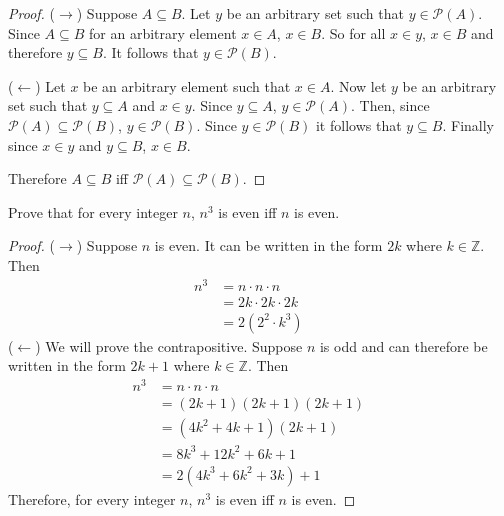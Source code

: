 \begin{proof}
    ($\rightarrow$) Suppose $A \subseteq B$. 
    Let $y$ be an arbitrary set such that $y \in \mathcal{P}(A)$. 
    Since $A \subseteq B$ for an arbitrary element  $x \in A$, $x \in B$. 
    So for all $x \in y$, $x \in B$ and therefore $y \subseteq B$.
    It follows that $y \in \mathcal{P}(B)$.

    ($\leftarrow$) 
    Let $x$ be an arbitrary element such that $x \in A$.
    Now let $y$ be an arbitrary set such that $y \subseteq A$ and $x \in y$.
    Since $y \subseteq A$, $y \in \mathcal{P}(A)$.
    Then, since $\mathcal{P}(A) \subseteq \mathcal{P}(B)$, $y \in \mathcal{P}(B)$.
    Since $y \in \mathcal{P}(B)$ it follows that $y \subseteq B$.
    Finally since $x \in y$ and $y \subseteq B$, $x \in B$.

    Therefore $A \subseteq B$ iff $\mathcal{P}(A) \subseteq \mathcal{P}(B)$.
\end{proof}

\begin{tcolorbox}[title=Problem 11, breakable]
    Prove that for every integer $n$, $n^3$ is even iff $n$ is even.
\end{tcolorbox}

\begin{proof}
    ($\rightarrow$) Suppose $n$ is even. It can be written in the form $2k$ where $k \in \mathbb{Z}$.
    Then 
    \begin{align*}
        n^3 & = n \cdot n \cdot n    &  & \\
            & = 2k \cdot 2k \cdot 2k &  & \\
            & = 2(2^2 \cdot k^3)
    \end{align*}
    ($\leftarrow$) We will prove the contrapositive. Suppose $n$ is odd and can therefore be written 
    in the form $2k + 1$ where $k \in \mathbb{Z}$.
    Then 
    \begin{align*}
        n^3 & = n \cdot n \cdot n        &  & \\
            & = (2k + 1)(2k + 1)(2k + 1) &  & \\
            & = (4k^2 + 4k + 1)(2k + 1)  &  & \\
            & = 8k^3 + 12k^2 + 6k + 1    &  & \\
            & = 2(4k^3 + 6k^2 + 3k) + 1
    \end{align*}
    Therefore, for every integer $n$, $n^3$ is even iff $n$ is even.
\end{proof}

